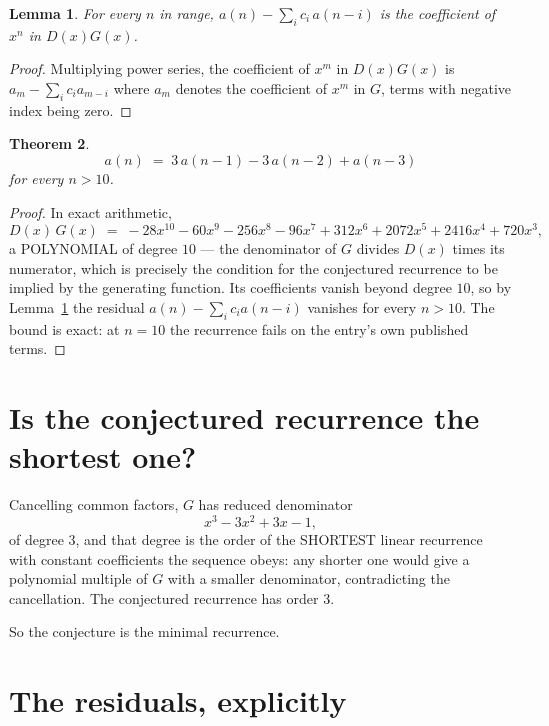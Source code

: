 \documentclass[11pt,a4paper]{article}
\theoremstyle{plain}
\newtheorem{theorem}{Theorem}
\newtheorem{lemma}[theorem]{Lemma}
\theoremstyle{definition}
\begin{document}
\begin{lemma}\label{lem:key}
For every $n$ in range, $a(n)-\sum_i c_i\,a(n-i)$ is the coefficient of $x^{n}$ in
$D(x)G(x)$.
\end{lemma}

\begin{proof}
Multiplying power series, the coefficient of $x^{m}$ in $D(x)G(x)$ is
$a_m-\sum_i c_i a_{m-i}$ where $a_m$ denotes the coefficient of $x^{m}$ in $G$, terms with
negative index being zero.
\end{proof}

\begin{theorem}
\[
a(n)\;=\;3\,a(n-1) - 3\,a(n-2) + a(n-3)
\]
for every $n>10$.
\end{theorem}

\begin{proof}
In exact arithmetic,
\[
D(x)\,G(x)\;=\;- 28 x^{10} - 60 x^{9} - 256 x^{8} - 96 x^{7} + 312 x^{6} + 2072 x^{5} + 2416 x^{4} + 720 x^{3},
\]
a POLYNOMIAL of degree $10$ --- the denominator of $G$ divides $D(x)$ times its numerator,
which is precisely the condition for the conjectured recurrence to be implied by the
generating function. Its coefficients vanish beyond degree $10$, so by
Lemma~\ref{lem:key} the residual $a(n)-\sum_ic_ia(n-i)$ vanishes for every
$n>10$. The bound is exact: at $n=10$ the recurrence fails on the entry's own published terms.
\end{proof}

\section{Is the conjectured recurrence the shortest one?}

Cancelling common factors, $G$ has reduced denominator
\[
x^{3} - 3 x^{2} + 3 x - 1,
\]
of degree $3$, and that degree is the order of the SHORTEST linear recurrence with
constant coefficients the sequence obeys: any shorter one would give a polynomial multiple of
$G$ with a smaller denominator, contradicting the cancellation. The conjectured recurrence has
order $3$.

So the conjecture is the minimal recurrence.

\section{The residuals, explicitly}
\end{document}
